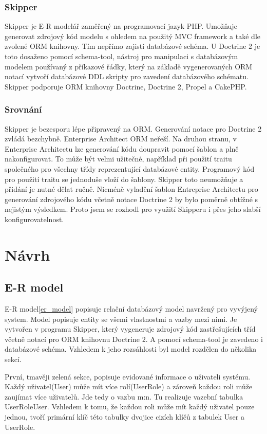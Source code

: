 \documentclass[thesis=B,czech]{FITthesis}[2012/06/26]
\begin{document}
\subsection{Skipper}
	Skipper je E-R modelář zaměřený na programovací jazyk PHP. Umožňuje generovat zdrojový kód modelu s ohledem na použitý MVC framework a také dle zvolené ORM knihovny. Tím nepřímo zajistí databázové schéma. U Doctrine 2 je toto dosaženo pomocí schema-tool, nástroj pro manipulaci s databázovým modelem používaný z příkazové řádky, který na základě vygenerovaných ORM notací vytvoří databázové DDL skripty pro zavedení databázového schématu. Skipper podporuje ORM knihovny Doctrine, Doctrine 2, Propel a CakePHP.

\subsection{Srovnání}
	Skipper je bezesporu lépe připravený na ORM. Generování notace pro Doctrine 2 zvládá bezchybně. Enterprise Architect ORM neřeší. Na druhou stranu, v Enterprise Architectu lze generování kódu doupravit pomocí šablon a plně nakonfigurovat. To může být velmi užitečné, například při použití traitu společného pro všechny třídy reprezentující databázové entity. Programový kód pro použití traitu se jednoduše vloží do šablony. Skipper toto neumožňuje a přidání je nutné dělat ručně. Nicméně vyladění šablon Entreprise Architectu pro generování zdrojového kódu včetně notace Doctrine 2 by bylo poměrně obtížné s nejistým výsledkem. Proto jsem se rozhodl pro využití Skipperu i přes jeho slabší konfigurovatelnost.	

\chapter{Návrh}

\section{E-R model}
	E-R model\ref{er_model} popisuje relační databázový model navržený pro vyvýjený system. Model popisuje entity se všemi vlastnostmi a vazby mezi nimi. Je vytvořen v programu Skipper, který vygeneruje zdrojový kód zastřešujících tříd včetně notací pro ORM knihovnu Doctrine 2. A pomocí schema-tool je zavedeno i databázové schéma. Vzhledem k jeho rozsáhlosti byl model rozdělen do několika sekcí.
	
	První, tmavěji zelená sekce, popisuje evidované informace o uživateli systému. Každý uživatel(User) může mít více rolí(UserRole) a zároveň každou roli může zaujímat více uživatelů. Jde tedy o vazbu m:n. Tu realizuje vazební tabulka UserRoleUser. Vzhledem k tomu, že každou roli může mít každý uživatel pouze jednou, tvoří primární klíč této tabulky dvojice cizích klíčů z tabulek User a UserRole.
	
\end{document}
